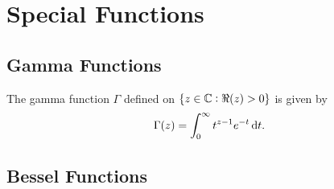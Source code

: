 \chapter{Special Functions}
\section{Gamma Functions}
\begin{defn}
The gamma function $\Gamma$ defined on $\{z \in \mathbb{C}: \Re(z) > 0\}$ is given 
by 
\begin{equation}
    \label{equ:spacial_functions:gamma_function}
    \Gamma(z) = \int_{0}^{\infty} t^{z - 1} e^{-t} \mathop{}\!\mathrm{d} t. 
\end{equation}
\end{defn}

\section{Bessel Functions}